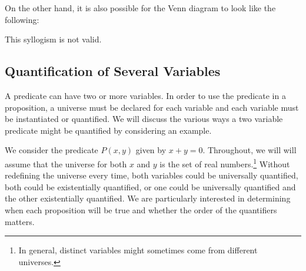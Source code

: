 \begin{example}
\begin{enumerate}
\begin{center}
\begin{tikzpicture}
\end{tikzpicture}
\end{center}
On the other hand, it is also possible for the Venn diagram to look like the following:
\begin{center}
\end{center}
This syllogism is not valid.
\end{enumerate}
\end{example}

\subsection{Quantification of Several Variables}

A predicate can have two or more variables. In order to use the predicate in a proposition, a universe must be declared for each variable and each variable must be instantiated or quantified. We will discuss the various ways a two variable predicate might be quantified by considering an example.

We consider the predicate $P(x,y)$ given by $x+y=0$. Throughout, we will will assume that the universe for both $x$ and $y$ is the set of real numbers.\footnote{In general, distinct variables might sometimes come from different universes.} Without redefining the universe every time, both variables could be universally quantified, both could be existentially quantified, or one could be universally quantified and the other existentially quantified. We are particularly interested in determining when each proposition will be true and whether the order of the quantifiers matters.


